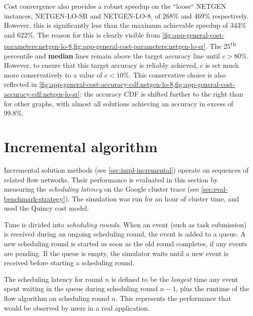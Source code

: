 Cost convergence also provides a robust speedup on the ``loose`` NETGEN instances, NETGEN-LO-SR and NETGEN-LO-8, of 268\% and 469\% respectively. However, this is significantly less than the maximum achievable speedup of 343\% and 622\%. The reason for this is clearly visible from \cref{fig:app-general-cost-parameters:netgen-lo-8,fig:app-general-cost-parameters:netgen-lo-sr}. The 25\textsuperscript{th} percentile and \textbf{\color{matplotlib_cyan} median} lines remain above the target accuracy line until $c > 80\%$. However, to ensure that this target accuracy is reliably achieved, $c$ is set much more conservatively to a value of $c < 10\%$. This conservative choice is also reflected in \cref{fig:app-general-cost-accuracy-cdf:netgen-lo-8,fig:app-general-cost-accuracy-cdf:netgen-lo-sr}: the accuracy CDF is shifted further to the right than for other graphs, with almost all solutions achieving an accuracy in excess of 99.8\%.

\section{Incremental algorithm} \label{sec:eval-incremental}

Incremental solution methods (see \cref{sec:impl-incremental}) operate on sequences of related flow networks. Their performance is evaluated in this section by measuring the \emph{scheduling latency} on the Google cluster trace (see \cref{sec:eval-benchmark-strategy}). The simulation was run for an hour of cluster time\footnotemark, and used the Quincy cost model.

Time is divided into \emph{scheduling rounds}. When an event (such as task submission) is received during an ongoing scheduling round, the event is added to a queue. A new scheduling round is started as soon as the old round completes, if any events are pending. If the queue is empty, the simulator waits until a new event is received before starting a scheduling round. 

The scheduling latency for round $n$ is defined to be the \emph{longest} time any event spent waiting in the queue during scheduling round $n-1$, plus the runtime of the flow algorithm on scheduling round $n$. This represents the performance that would be observed by users in a real application.

